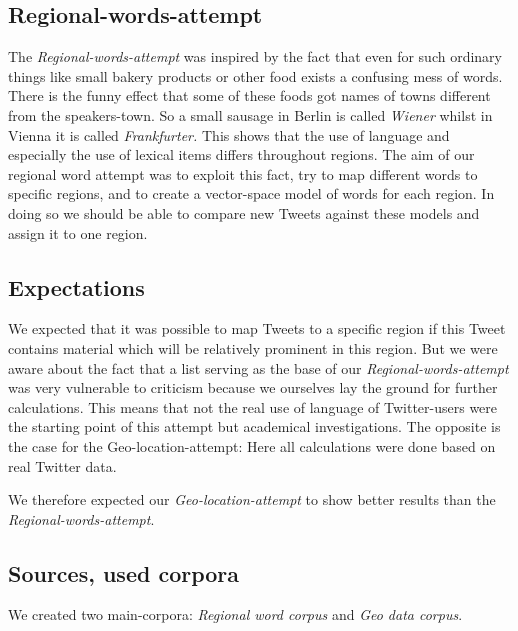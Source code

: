 \documentclass[./Main.tex]{subfiles}
\begin{document}
\subsection{Regional-words-attempt}
The \emph{Regional-words-attempt} was inspired by the fact that even for such ordinary things like small bakery products or other food exists a confusing mess of words. There is the funny effect that some of these foods got names of towns different from the speakers-town. So a small sausage in Berlin is called \textit{Wiener} whilst in Vienna it is called \textit{Frankfurter.} This shows that the use of language and especially the use of lexical items differs throughout regions. The aim of our regional word attempt was to exploit this fact, try to map different words to specific regions, and to create a vector-space model of words for each region. In doing so we should be able to compare new Tweets against these models and assign it to one region.

\subsection{Expectations}
We expected that it was possible to map Tweets to a specific region if this Tweet contains material which will be relatively prominent in this region. But we were aware about the fact that a list serving as the base of our \emph{Regional-words-attempt} was very vulnerable to criticism because we ourselves lay the ground for further calculations. This means that not the real use of language of Twitter-users were the starting point of this attempt but academical investigations. The opposite is the case for the Geo-location-attempt: Here all calculations were done based on real Twitter data.

We therefore expected our \emph{Geo-location-attempt} to show better results than the \emph{Regional-words-attempt}.

\subsection{Sources, used corpora}
We created two main-corpora: \emph{Regional word corpus} and \emph{Geo data corpus}.
\end{document}
